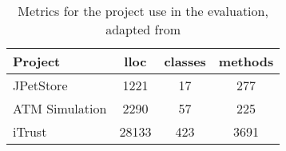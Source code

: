 \begin{table}[]
    \centering
    \begin{tabular}{lccc}
         Project & lloc & classes & methods \\
         \hline
         JPetStore & 1221 & 17 & 277 \\
         ATM Simulation & 2290 & 57 & 225 \\
         iTrust & 28133 & 423 & 3691
         
    \end{tabular}
    \caption{Metrics for the project use in the evaluation, adapted from \cite{peldszus_secure_2019}}
    \label{tab:sample_systems}
\end{table}